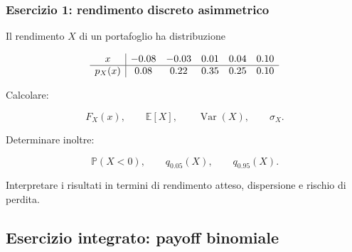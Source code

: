\documentclass[handout]{beamer}%
\providecommand{\E}{\mathbb{E}}
\providecommand{\Prob}{\mathbb{P}}
\providecommand{\1}{\mathbf{1}}
\providecommand{\Var}{\operatorname{Var}}
\providecommand{\QTR}[2]{\csname #1\endcsname{#2}}
\begin{document}
\begin{frame}%
%

\frametitle{Esercizio 1: rendimento discreto asimmetrico}%


Il rendimento $X$ di un portafoglio ha distribuzione%

\[%
\begin{array}
[c]{c|ccccc}%
x & -0.08 & -0.03 & 0.01 & 0.04 & 0.10\\\hline
p_{X}(x) & 0.08 & 0.22 & 0.35 & 0.25 & 0.10
\end{array}
\]


Calcolare:%

\[
F_{X}(x), \qquad\E[X], \qquad\Var(X), \qquad\sigma_{X}.
\]


\medskip

Determinare inoltre:%

\[
\Prob(X<0), \qquad q_{0.05}(X), \qquad q_{0.95}(X).
\]


\medskip

Interpretare i risultati in termini di rendimento atteso, dispersione e
rischio di perdita.%

\transboxout
\end{frame}%




\subsection{Esercizio integrato: payoff binomiale}%
\end{document}
